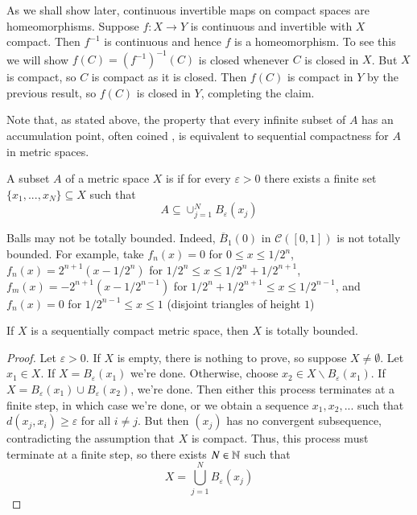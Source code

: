 \begin{example}
    As we shall show later, continuous invertible maps on compact spaces are homeomorphisms. Suppose $f:X\rightarrow Y$ is continuous and invertible with $X$ compact. Then $f^{-1}$ is continuous and hence $f$ is a homeomorphism. To see this we will show $f(C) = (f^{-1})^{-1}(C)$ is closed whenever $C$ is closed in $X$. But $X$ is compact, so $C$ is compact as it is closed. Then $f(C)$ is compact in $Y$ by the previous result, so $f(C)$ is closed in $Y$, completing the claim.
\end{example}

Note that, as stated above, the property that every infinite subset of $A$ has an accumulation point, often coined , is equivalent to sequential compactness for $A$ in metric spaces.

\begin{definition}
    A subset $A$ of a metric space $X$ is  if for every $\varepsilon > 0$ there exists a finite set $\{x_1,...,x_N\} \subseteq X$ such that \begin{equation*}
        A \subseteq \cup_{j=1}^NB_{\varepsilon}(x_j)
    \end{equation*}
\end{definition}

\begin{example}
    Balls may not be totally bounded. Indeed, $\overline{B}_1(0)$ in $\mathcal{C}([0,1])$ is not totally bounded. For example, take $f_n(x) = 0$ for $0 \leq x \leq 1/2^n$, $f_n(x) = 2^{n+1}(x-1/2^n)$ for $1/2^n \leq x \leq 1/2^n+1/2^{n+1}$, $f_m(x) = -2^{n+1}(x-1/2^{n-1})$ for $1/2^n+1/2^{n+1} \leq x \leq 1/2^{n-1}$, and $f_n(x) = 0$ for $1/2^{n-1}\leq x\leq 1$ (disjoint triangles of height $1$)
\end{example}


\begin{proposition}\label{prop:2.3.1}
    If $X$ is a sequentially compact metric space, then $X$ is totally bounded.
\end{proposition}
\begin{proof}
    Let $\varepsilon > 0$. If $X$ is empty, there is nothing to prove, so suppose $X \neq \emptyset$. Let $x_1 \in X$. If $X = B_{\varepsilon}(x_1)$ we're done. Otherwise, choose $x_2 \in X\backslash B_{\varepsilon}(x_1)$. If $X = B_{\varepsilon}(x_1)\cup B_{\varepsilon}(x_2)$, we're done. Then either this process terminates at a finite step, in which case we're done, or we obtain a sequence $x_1,x_2,...$ such that $d(x_j,x_i) \geq \varepsilon$ for all $i \neq j$. But then $(x_j)$ has no convergent subsequence, contradicting the assumption that $X$ is compact. Thus, this process must terminate at a finite step, so there exists $N \in \mathbb N$ such that $$X  = \bigcup_{j=1}^NB_{\varepsilon}(x_j)$$
\end{proof}

